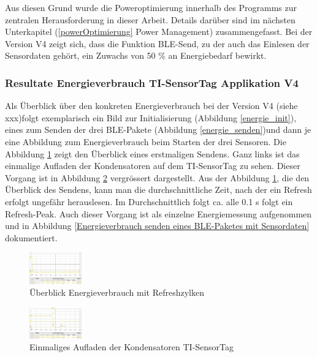 Aus diesen Grund wurde die Poweroptimierung innerhalb des Programms zur zentralen Herausforderung in dieser Arbeit. Details darüber sind im nächsten Unterkapitel (\ref{powerOptimierung} Power Management) zusammengefasst. Bei der Version V4 zeigt sich, dass die Funktion BLE-Send, zu der auch das Einlesen der Sensordaten gehört, ein Zuwachs von 50 \% an Energiebedarf bewirkt. 



\subsubsection{Resultate Energieverbrauch TI-SensorTag Applikation V4}
\label{energie senosortag} 

Als Überblick über den konkreten Energieverbrauch bei der Version V4 (siehe  xxx)folgt exemplarisch ein Bild zur Initialisierung (Abbildung \ref{energie_init}), eines zum Senden der drei BLE-Pakete (Abbildung \ref{energie_senden})und dann je eine Abbildung zum Energieverbrauch beim Starten der drei Sensoren. Die Abbildung \ref{energie_ueberblick} zeigt den Überblick eines erstmaligen Sendens. Ganz links ist das einmalige Aufladen der Kondensatoren auf dem TI-SensorTag zu sehen. Dieser Vorgang ist in Abbildung \ref{energie_kondensatoren_sensortag} vergrössert dargestellt. Aus der Abbildung \ref{energie_ueberblick}, die den Überblick des Sendens, kann man die durchschnittliche Zeit, nach der ein Refresh erfolgt ungefähr herauslesen. Im Durchschnittlich folgt ca. alle 0.1 s folgt ein Refresh-Peak. Auch dieser Vorgang ist als einzelne Energiemessung aufgenommen und in Abbildung \ref{Energieverbrauch senden eines BLE-Paketes mit Sensordaten} dokumentiert. 


\begin{figure}[ht]
  \includegraphics[width=0.2\textwidth]{3Vorgehen/imag/Ueberblick.png}
  \caption{Überblick Energieverbrauch mit Refreshzylken}
  \label{energie_ueberblick}
\end{figure}

\begin{figure}[ht]
  \includegraphics[width=0.2\textwidth]{3Vorgehen/imag/Energie_Laden_Kondensatoren_Sensortag.png}
  \caption{Einmaliges Aufladen der Kondensatoren TI-SensorTag}
  \label{energie_kondensatoren_sensortag}
\end{figure}



